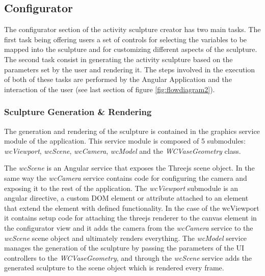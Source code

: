 \documentclass[../medieninformatik-arbeit.tex]{subfiles}
\begin{document}
\subsection{Configurator}
The configurator section of the activity sculpture creator has two main tasks. The first task being offering users a set of controls for selecting the variables to be mapped into the sculpture and for customizing different aspects of the sculpture. The second task consist in generating the activity sculpture based on the parameters set by the user and rendering it. The steps involved in the execution of both of these tasks are performed by the Angular Application and the interaction of the user (see last section of figure \ref{fig:flowdiagram2}).

\subsubsection{Sculpture Generation \& Rendering}
The generation and rendering of the sculpture is contained in the graphics service module of the application. This service module is composed of 5 submodules: \textit{wcViewport}, \textit{wcScene}, \textit{wcCamera}, \textit{wcModel} and the \textit{WCVaseGeometry} class. 

The \textit{wcScene} is an Angular service that exposes the Threejs scene object. In the same way the \textit{wcCamera} service contains code for configuring the camera and exposing it to the rest of the application. The \textit{wcViewport} submodule is an angular directive, a custom DOM element or attribute attached to an element that extend the element with defined functionality. In the case of the wcViewport it contains setup code for attaching the threejs renderer to the canvas element in the configurator view and it adds the camera from the \textit{wcCamera} service to the \textit{wcScene}  scene object and ultimately renders everything. The \textit{wcModel} service manages the generation of the sculpture by passing the parameters of the UI controllers to the \textit{WCVaseGeometry}, and through the \textit{wcScene} service adds the generated sculpture to the scene object which is rendered every frame. 
\end{document}
